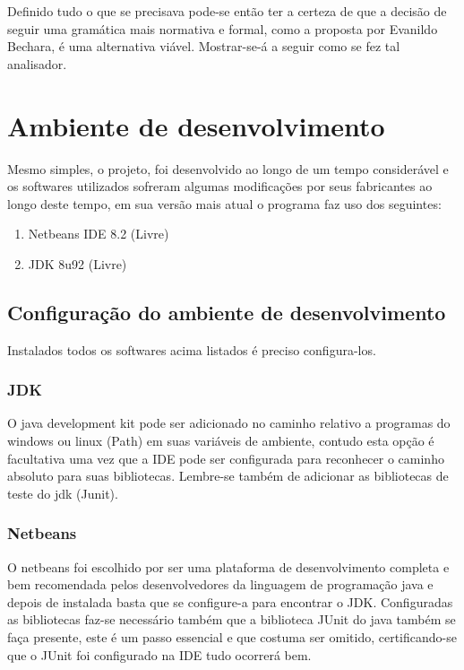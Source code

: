 \documentclass[12pt,a4paper,oneside,english,brazilian,brazil]{abntex2}
\begin{document}
\par Definido tudo o que se precisava pode-se então ter a certeza de que a decisão de seguir uma gramática mais normativa e formal, como a proposta por Evanildo Bechara, é uma alternativa viável. Mostrar-se-á a seguir como se fez tal analisador.\

\chapter{Ambiente de desenvolvimento}

\par Mesmo simples, o projeto, foi desenvolvido ao longo de um tempo considerável e os softwares utilizados sofreram algumas modificações por seus fabricantes ao longo deste tempo, em sua versão mais atual o programa faz uso dos seguintes: \

\begin{enumerate}
	\item Netbeans IDE 8.2 (Livre)
	\item JDK 8u92 (Livre)
\end{enumerate}

\section{Configuração do ambiente de desenvolvimento}

\par Instalados todos os softwares acima listados é preciso configura-los. \

\subsection{JDK}

	\par O java development kit pode ser adicionado no caminho relativo a programas do windows ou linux (Path) em suas variáveis de ambiente, contudo esta opção é facultativa uma vez que a IDE pode ser configurada para reconhecer o caminho absoluto para suas bibliotecas. Lembre-se também de adicionar as bibliotecas de teste do jdk (Junit). \

\subsection{Netbeans}
	\par O netbeans foi escolhido por ser uma plataforma de desenvolvimento completa e bem recomendada pelos desenvolvedores da linguagem de programação java e depois de instalada basta que se configure-a para encontrar o JDK. Configuradas as bibliotecas faz-se necessário também que a biblioteca JUnit do java também se faça presente, este é um passo essencial e que costuma ser omitido, certificando-se que o JUnit foi configurado na IDE tudo ocorrerá bem.\
	
\end{document}
